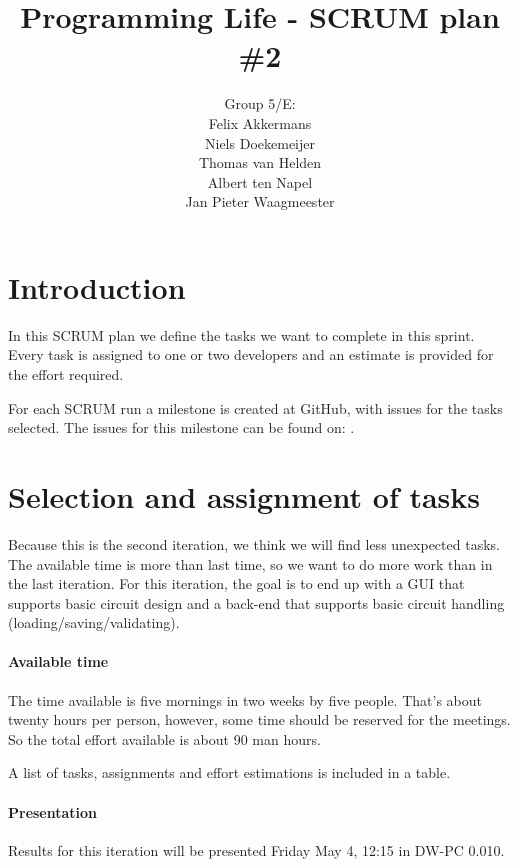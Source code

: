 \documentclass[a4paper]{article}
\title{Programming Life - SCRUM plan \#2}
\author{Group 5/E:\\
Felix Akkermans \\
Niels Doekemeijer \\
Thomas van Helden \\
Albert ten Napel \\
Jan Pieter Waagmeester}
\begin{document}
\maketitle

\section{Introduction}
In this SCRUM plan we define the tasks we want to complete in this sprint. Every task is assigned to one or two developers and an estimate is provided for the effort required.

For each SCRUM run a milestone is created at GitHub, with issues for the tasks selected. The issues for this milestone can be found on: .

\section{Selection and assignment of tasks}
Because this is the second iteration, we think we will find less unexpected tasks. The available time is more than last time, so we want to do more work than in the last iteration. For this iteration, the goal is to end up with a GUI that supports basic circuit design and a back-end that supports basic circuit handling (loading/saving/validating).

\paragraph{Available time}
The time available is five mornings in two weeks by five people. That's about twenty hours per person, however, some time should be reserved for the meetings. So the total effort available is about 90 man hours.

A list of tasks, assignments and effort estimations is included in a table.


\paragraph{Presentation}
Results for this iteration will be presented Friday May 4, 12:15 in DW-PC 0.010.
\end{document}
